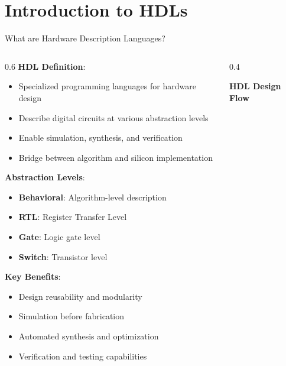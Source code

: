 \documentclass[aspectratio=169]{beamer}
\newcommand{\concept}[1]{\textbf{\color{darkblue}#1}}
\begin{document}
\section{Introduction to HDLs}

\begin{frame}{What are Hardware Description Languages?}
\begin{columns}
\begin{column}{0.6\textwidth}
\concept{HDL Definition}:
\begin{itemize}
\item Specialized programming languages for hardware design
\item Describe digital circuits at various abstraction levels
\item Enable simulation, synthesis, and verification
\item Bridge between algorithm and silicon implementation
\end{itemize}

\vspace{0.3cm}
\concept{Abstraction Levels}:
\begin{itemize}
\item \textbf{Behavioral}: Algorithm-level description
\item \textbf{RTL}: Register Transfer Level
\item \textbf{Gate}: Logic gate level
\item \textbf{Switch}: Transistor level
\end{itemize}

\vspace{0.3cm}
\concept{Key Benefits}:
\begin{itemize}
\item Design reusability and modularity
\item Simulation before fabrication
\item Automated synthesis and optimization
\item Verification and testing capabilities
\end{itemize}
\end{column}
\begin{column}{0.4\textwidth}
\begin{center}
\textbf{HDL Design Flow}
\vspace{0.3cm}

\end{center}
\end{column}
\end{columns}
\end{frame}
\end{document}
